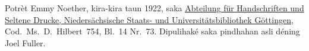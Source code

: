 Potrèt Emmy Noether, kira-kira taun 1922, saka
\href{http://www.sub.uni-goettingen.de/en/contact/departments-a-z/departmental-and-unit-details/abteilunggruppe/handschriften-und-seltene-drucke/}{Abteilung
f\"ur Handschriften und Seltene Drucke, Nieders\"achsische Staats- und
Universit\"atsbibliothek G\"ottingen}, Cod.~Ms.~D.~Hilbert~754,
Bl.~14 Nr.~73. Dipulihaké saka pindhahan asli déning Joel Fuller.
